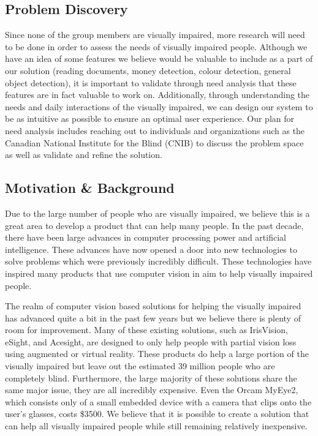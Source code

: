 \documentclass[a4paper,11pt]{article}
\begin{document}
\subsection{Problem Discovery}
Since none of the group members are visually impaired, more research will need to be done in order to assess the needs of visually impaired people. Although we have an idea of some features we believe would be valuable to include as a part of our solution (reading documents, money detection, colour detection, general object detection), it is important to validate through need analysis that these features are in fact valuable to work on. Additionally, through understanding the needs and daily interactions of the visually impaired, we can design our system to be as intuitive as possible to ensure an optimal user experience. Our plan for need analysis includes reaching out to individuals and organizations such as the Canadian National Institute for the Blind (CNIB) to discuss the problem space as well as validate and refine the solution.

\subsection{Motivation \& Background}
Due to the large number of people who are visually impaired, we believe this is a great area to develop a product that can help many people. In the past decade, there have been large advances in computer processing power and artificial intelligence. These advances have now opened a door into new technologies to solve problems which were previously incredibly difficult. These technologies have inspired many products that use computer vision in aim to help visually impaired people.

The realm of computer vision based solutions for helping the visually impaired has advanced quite a bit in the past few years but we believe there is plenty of room for improvement. Many of these existing solutions, such as IrisVision, eSight, and Acesight, are designed to only help people with partial vision loss using augmented or virtual reality. \cite{glasses} These products do help a large portion of the visually impaired but leave out the estimated 39 million people who are completely blind. Furthermore, the large majority of these solutions share the same major issue, they are all incredibly expensive. Even the Orcam MyEye2, which consists only of a small embedded device with a camera that clips onto the user's glasses, costs \$3500. \cite{glasses} We believe that it is possible to create a solution that can help all visually impaired people while still remaining relatively inexpensive.
\end{document}
